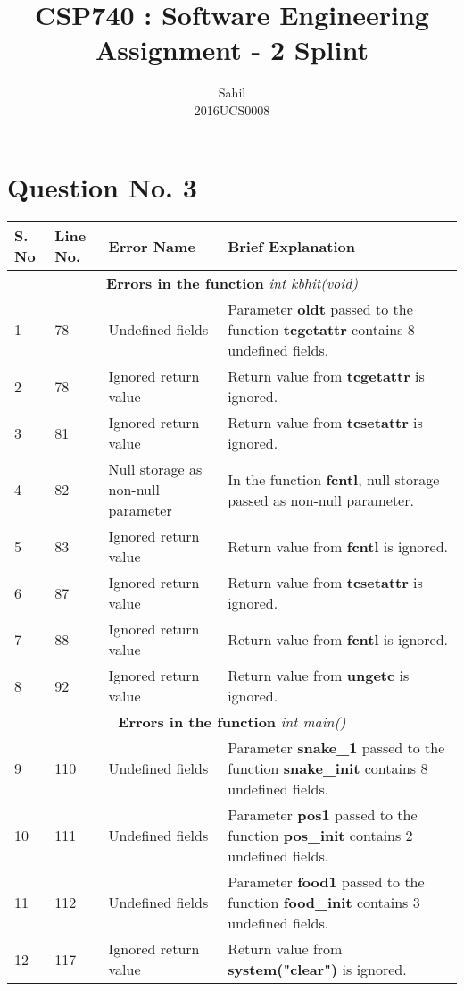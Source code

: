\documentclass[]{article}
\title{\centering CSP740 : Software Engineering \\Assignment - 2 Splint}
\author{Sahil\\  2016UCS0008}
\begin{document}
	
	\maketitle	
	\section{Question No. 3}
	\large
	\begin{longtable}{ |p{0.5cm}|p{0.75cm}|p{3cm}|p{9cm}|  }
		\hline
		S. No & Line No.	&	Error Name	&	Brief Explanation	\\
		\hline
		\multicolumn{4}{|c|}{\textbf{Errors in the function} \textit{int kbhit(void)}} \\
		\hline
		1 & 78 & Undefined fields & Parameter \textbf{oldt} passed to the function \textbf{tcgetattr} contains 8 undefined fields. \\
		\hline
		2 & 78 & Ignored return value & Return value from \textbf{tcgetattr} is ignored. \\
		\hline
		3 & 81 & Ignored return value & Return value from \textbf{tcsetattr} is ignored. \\
		\hline
		4 & 82 & Null storage as non-null parameter & In the function \textbf{fcntl}, null storage passed as non-null parameter.  \\
		\hline
		5 & 83 & Ignored return value & Return value from \textbf{fcntl} is ignored. \\
		\hline
		6 & 87 & Ignored return value & Return value from \textbf{tcsetattr} is ignored. \\
		\hline
		7 & 88 & Ignored return value & Return value from \textbf{fcntl} is ignored. \\
		\hline 
		8 & 92 & Ignored return value & Return value from \textbf{ungetc} is ignored. \\
		\hline 
		\multicolumn{4}{|c|}{\textbf{Errors in the function} \textit{int main()}} \\
		\hline 
		9 & 110 & Undefined fields & Parameter \textbf{snake\_1} passed to the function \textbf{snake\_init} contains 8 undefined fields. \\
		\hline 
		10 & 111 & Undefined fields & Parameter \textbf{pos1} passed to the function \textbf{pos\_init} contains 2 undefined fields. \\
		\hline 
		11 & 112 & Undefined fields & Parameter \textbf{food1} passed to the function \textbf{food\_init} contains 3 undefined fields. \\
		\hline 
		12 & 117 & Ignored return value  & Return value from \textbf{system("clear")} is ignored. \\

\end{longtable}
\end{document}
